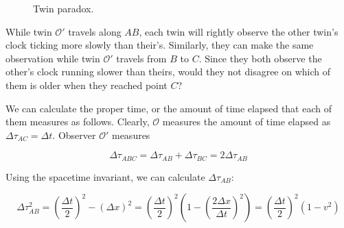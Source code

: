 \documentclass[11pt]{article}
\begin{document}
\begin{figure}[H]
    \caption{Twin paradox.}
    \label{fig:twinparadox}
\end{figure}

While twin $\mathcal{O}'$ travels along $AB$, each twin will rightly observe the other twin's clock ticking more slowly than their's. Similarly, they can make the same observation while twin $\mathcal{O'}$ travels from $B$ to $C$. Since they both observe the other's clock running slower than theirs, would they not disagree on which of them is older when they reached point $C$?

We can calculate the proper time, or the amount of time elapsed that each of them measures as follows. Clearly, $\mathcal{O}$ measures the amount of time elapsed as $\Delta\tau_{AC} = \Delta t$. Observer $\mathcal{O'}$ measures

\begin{equation}\label{eq:abc}
  \Delta\tau_{ABC} = \Delta\tau_{AB} + \Delta\tau_{BC} = 2\Delta\tau_{AB}
\end{equation}

Using the spacetime invariant, we can calculate $\Delta\tau_{AB}$:

\begin{equation}\label{eq:ab}
  \Delta\tau_{AB}^2 = \left(\frac{\Delta t}{2}\right)^2 - (\Delta x)^2 = \left(\frac{\Delta t}{2}\right)^2 \left(1 - \left(\frac{2\Delta x}{\Delta t}\right)^2\right) = \left(\frac{\Delta t}{2}\right)^2(1 - v^2)
\end{equation}
\end{document}

